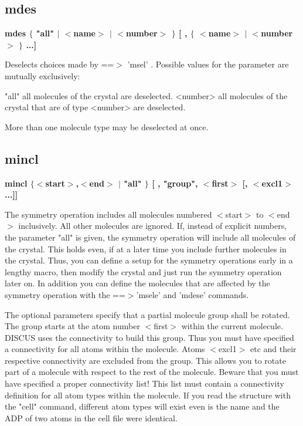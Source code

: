 \subsection*{mdes}
{\bf mdes $ \{$ "all" $| $ $ <$name$> $ $| $ $ <$number$> $ $\} $ [ , $ \{$ $ <$name$> $ $| $ $ <$number$> $ $\} $ ...] \par }
\par
\vspace{3pt}
Deselects choices made by ==$> $ 'msel' . Possible values 
for the parameter are mutually exclusively: 
\par
\begin{MacVerbatim}
"all"     all molecules of the crystal are deselected.
<number>  all molecules of the crystal that are of type <number>
          are deselected.
\end{MacVerbatim}
More than one molecule type may be deselected at once. 
\subsection*{mincl}
{\bf mincl $ \{$$ <$start$> $,$ <$end$> $ $| $ "all" $\} $ [ , "group", $ <$first$> $ [, $ <$excl1$> $...]] \par }
\par
\vspace{3pt}
The symmetry operation includes all molecules numbered $ <$start$> $ to $ <$end$> $ 
inclusively. All other molecules are ignored. 
If, instead of explicit numbers, the parameter "all" is given, the 
symmetry operation will include all molecules of the crystal. This holds 
even, if at a later time you include further molecules in the crystal. 
Thus, you can define a setup for the symmetry operations early in a 
lengthy macro, then modify the crystal and just run the symmetry 
operation later on. 
In addition you can define the molecules that are affected by the 
symmetry operation with the ==$> $'msele' and 'mdese' commands. 
\par
The optional parameters specify that a partial molecule group 
shall be rotated. The group starts at the atom number $ <$first$> $ 
within the current molecule. DISCUS uses the connectivity to 
build this group. Thus you must have specified a connectivity 
for all atoms within the molecule. Atoms $ <$excl1$> $ etc and their 
respective connectivity are excluded from the group. 
This allows you to rotate part of a molecule with respect to 
the rest of the molecule. 
Beware that you must have specified a proper connectivity list! 
This list must contain a connectivity definition for all atom 
types within the molecule. If you read the structure with the 
"cell" command, different atom types will exist even is the 
name and the ADP of two atoms in the cell file were identical. 
\par
